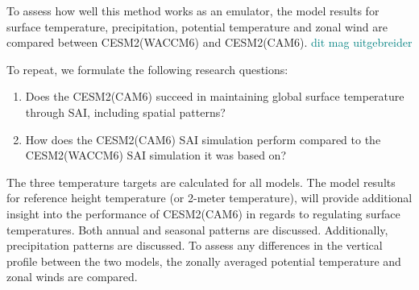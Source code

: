 To assess how well this method works as an emulator, the model results for surface temperature, precipitation, potential temperature and zonal wind are compared between CESM2(WACCM6) and CESM2(CAM6). \textcolor{teal}{dit mag uitgebreider}

To repeat, we formulate the following research questions:

\begin{enumerate}
    \item Does the CESM2(CAM6) succeed in maintaining global surface temperature through SAI, including spatial patterns?
    \item How does the CESM2(CAM6) SAI simulation perform compared to the CESM2(WACCM6) SAI simulation it was based on?
\end{enumerate}

The three temperature targets are calculated for all models. The model results for reference height temperature (or 2-meter temperature), will provide additional insight into the performance of CESM2(CAM6) in regards to regulating surface temperatures. Both annual and seasonal patterns are discussed. Additionally, precipitation patterns are discussed. To assess any differences in the vertical profile between the two models, the zonally averaged potential temperature and zonal winds are compared. 
